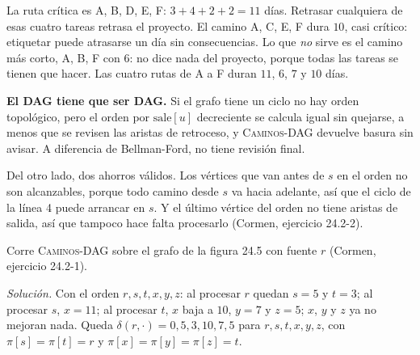 \documentclass[11pt,letterpaper]{article}
\begin{document}
\begin{ejemplo}
\begin{center}
  \end{center}
  La ruta crítica es A, B, D, E, F: $3 + 4 + 2 + 2 = 11$ días.
  Retrasar cualquiera de esas cuatro tareas retrasa el proyecto. El
  camino A, C, E, F dura $10$, casi crítico: etiquetar puede atrasarse
  un día sin consecuencias. Lo que \emph{no} sirve es el camino más
  corto, A, B, F con $6$: no dice nada del proyecto, porque todas las
  tareas se tienen que hacer. Las cuatro rutas de A a F duran $11$,
  $6$, $7$ y $10$ días.
\end{ejemplo}

\begin{ojo}
  \textbf{El DAG tiene que ser DAG.} Si el grafo tiene un ciclo no hay
  orden topológico, pero el orden por $\text{sale}[u]$ decreciente se
  calcula igual sin quejarse, a menos que se revisen las aristas de
  retroceso, y \textsc{Caminos-DAG} devuelve basura sin avisar. A
  diferencia de Bellman-Ford, no tiene revisión final.

  \smallskip
  Del otro lado, dos ahorros válidos. Los vértices que van antes de
  $s$ en el orden no son alcanzables, porque todo camino desde $s$ va
  hacia adelante, así que el ciclo de la línea 4 puede arrancar en
  $s$. Y el último vértice del orden no tiene aristas de salida, así
  que tampoco hace falta procesarlo (Cormen, ejercicio 24.2-2).
\end{ojo}

\begin{ejercicio}
  Corre \textsc{Caminos-DAG} sobre el grafo de la figura 24.5 con
  fuente $r$ (Cormen, ejercicio 24.2-1).

  \textit{Solución.} Con el orden $r, s, t, x, y, z$: al procesar $r$
  quedan $s = 5$ y $t = 3$; al procesar $s$, $x = 11$; al procesar
  $t$, $x$ baja a $10$, $y = 7$ y $z = 5$; $x$, $y$ y $z$ ya no
  mejoran nada. Queda $\delta(r, \cdot) = 0, 5, 3, 10, 7, 5$ para
  $r, s, t, x, y, z$, con $\pi[s] = \pi[t] = r$ y
  $\pi[x] = \pi[y] = \pi[z] = t$.
\end{ejercicio}
\end{document}

